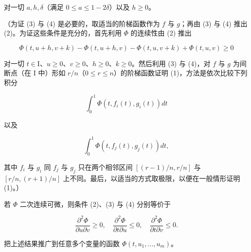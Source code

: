 对一切 \(a, h, \delta\)（满足 \(0 \leqslant a \leqslant 1 - 2\delta\)）以及 \(h \geqslant 0\)。

（为证 (3) 与 (4) 是必要的，取适当的阶梯函数作为 \(f\) 与 \(g\)；再由 (3) 与 (4) 推出 (2)。为证这些条件是充分的，首先利用 \(\Phi\) 的连续性由 (2) 推出

\[
\Phi (t, u + h, v + k) - \Phi (t, u + h, v) - \Phi (t, u, v + k) + \Phi (t, u, v) \geqslant 0\tag{5}
\]

对一切 \(t \in \mathrm{I}\)、\(u \geqslant 0\)、\(v \geqslant 0\)、\(h \geqslant 0\)、\(k \geqslant 0\)。然后利用 (3) 与 (4)，对 \(f\) 与 \(g\) 为间断点（在 \(\mathrm{I}\) 中）形如 \(r / n\)（\(0 \leqslant r \leqslant n\)）的阶梯函数证明 (1)，方法是依次比较下列积分

\[
\int_ {0} ^ {1} \Phi (t, f _ {i} (t), g _ {i} (t)) d t
\]

以及

\[
\int_ {0} ^ {1} \Phi (t, f _ {j} (t), g _ {j} (t)) d t,
\]

其中 \(f_{i}\) 与 \(g_{i}\) 同 \(f_{j}\) 与 \(g_{j}\) 只在两个相邻区间 \([(r - 1) / n, r / n]\) 与 \([r / n, (r + 1) / n]\) 上不同。最后，以适当的方式取极限，以便在一般情形证明 (1)。）

若 \(\Phi\) 二次连续可微，则条件 (2)、(3) 与 (4) 分别等价于

\[
\frac {\partial^ {2} \Phi}{\partial u \partial v} \geqslant 0, \quad \frac {\partial^ {2} \Phi}{\partial t \partial u} \leqslant 0, \quad \frac {\partial^ {2} \Phi}{\partial t \partial v} \leqslant 0.
\]

把上述结果推广到任意多个变量的函数 \(\Phi(t, u_1, \ldots, u_m)\)。

\setcounter{exercisegroup}{6}
\edef\CurrentExerciseGroup{\arabic{exercisegroup}}
